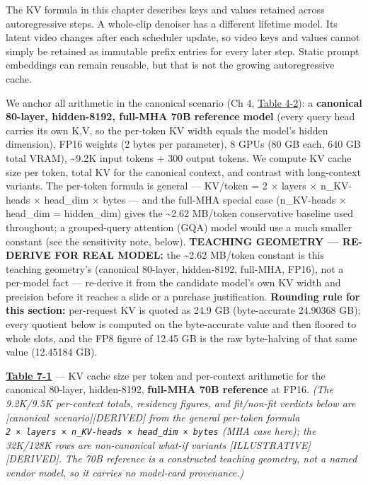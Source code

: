 The KV formula in this chapter describes keys and values retained across
autoregressive steps. A whole-clip denoiser has a different lifetime
model. Its latent video changes after each scheduler update, so video
keys and values cannot simply be retained as immutable prefix entries
for every later step. Static prompt embeddings can remain reusable, but
that is not the growing autoregressive cache.

\label{worked-example}


We anchor all arithmetic in the canonical scenario (Ch 4, \hyperref[tab:4.2]{Table 4-2}): a
\textbf{canonical 80-layer, hidden-8192, full-MHA 70B reference model}
(every query head carries its own K,V, so the per-token KV width equals
the model's hidden dimension), FP16 weights (2 bytes per parameter), 8
GPUs (80 GB each, 640 GB total VRAM), \textasciitilde9.2K input tokens +
300 output tokens. We compute KV cache size per token, total KV for the
canonical context, and contrast with long-context variants. The
per-token formula is general --- KV/token = 2 × layers × n\_KV-heads ×
head\_dim × bytes --- and the full-MHA special case (n\_KV-heads ×
head\_dim = hidden\_dim) gives the \textasciitilde2.62 MB/token
conservative baseline used throughout; a grouped-query attention (GQA)
model would use a much smaller constant (see the sensitivity note,
below). \textbf{TEACHING GEOMETRY --- RE-DERIVE FOR REAL MODEL:} the
\textasciitilde2.62 MB/token constant is this teaching geometry's
(canonical 80-layer, hidden-8192, full-MHA, FP16), not a per-model fact
--- re-derive it from the candidate model's own KV width and precision
before it reaches a slide or a purchase justification. \textbf{Rounding
rule for this section:} per-request KV is quoted as 24.9 GB
(byte-accurate 24.90368 GB); every quotient below is computed on the
byte-accurate value and then floored to whole slots, and the FP8 figure
of 12.45 GB is the raw byte-halving of that same value (12.45184 GB).

\textbf{\hyperref[tab:7.1]{Table 7-1}} --- KV cache size per token and per-context
arithmetic for the canonical 80-layer, hidden-8192, \textbf{full-MHA 70B
reference} at FP16. \emph{(The 9.2K/9.5K per-context totals, residency
figures, and fit/non-fit verdicts below are \mbox{{[}canonical
scenario{]}}\hspace{0pt}\mbox{{[}DERIVED{]}} from the general per-token formula
\texttt{2\ ×\ layers\ ×\ n\_KV-heads\ ×\ head\_dim\ ×\ bytes} (MHA case
here); the 32K/128K rows are non-canonical what-if variants
\mbox{{[}ILLUSTRATIVE{]}}\hspace{0pt}\mbox{{[}DERIVED{]}}. The 70B reference is a constructed
teaching geometry, not a named vendor model, so it carries no model-card
provenance.)}

